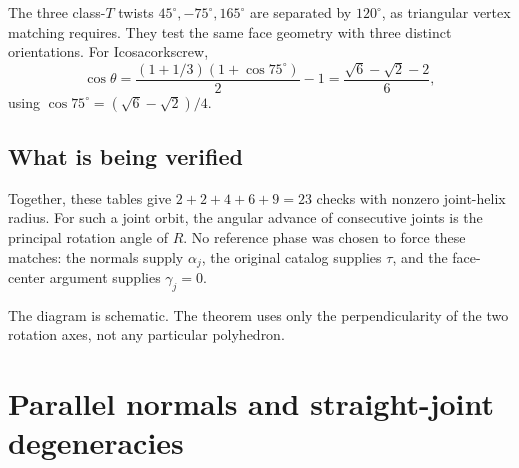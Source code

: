 \documentclass[11pt,letterpaper]{article}
\newcommand{\NB}{\vec N_B}
\newcommand{\NC}{\vec N_C}
\newcommand{\eff}{\tau_{\mathrm{eff}}}
\newcommand{\aj}{\alpha_j}
\newcommand{\gj}{\gamma_j}
\newcommand{\degc}{^{\circ}}
\newcommand{\uu}{\vec u}
\begin{document}
The three class-$T$ twists $45\degc,-75\degc,165\degc$ are separated
by $120\degc$, as triangular vertex matching requires. They test the same
face geometry with three distinct orientations. For Icosacorkscrew,
\[
  \cos\theta
  =\frac{(1+1/3)(1+\cos75\degc)}{2}-1
  =\frac{\sqrt6-\sqrt2-2}{6},
\]
using $\cos75\degc=(\sqrt6-\sqrt2)/4$.

\subsection{What is being verified}
Together, these tables give $2+2+4+6+9=23$ checks with nonzero joint-helix
radius. For such a joint orbit, the angular advance of consecutive joints
is the principal rotation angle of $R$. No reference phase was chosen to
force these matches: the normals supply $\aj$, the original catalog
supplies $\tau$, and the face-center argument supplies $\gj=0$.

\begin{center}
\end{center}
\small The diagram is schematic. The theorem uses only the perpendicularity
of the two rotation axes, not any particular polyhedron.\normalsize

\newpage
\section{Parallel normals and straight-joint degeneracies}\label{sec:degenerate}
\end{document}
